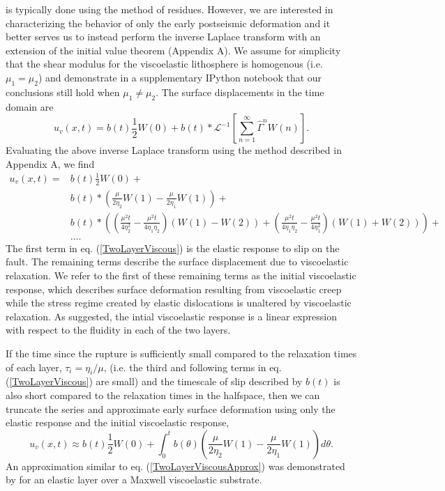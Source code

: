 \documentclass[extra]{gji}
\begin{document}
is typically done using the method of residues. However, we are interested in characterizing
the behavior of only the early postseismic deformation and it better serves us
to instead perform the inverse Laplace transform with an extension of
the initial value theorem (Appendix A). We assume for simplicity that
the shear modulus for the viscoelastic lithosphere is homogenous
(i.e. $\mu_1 = \mu_2$) and demonstrate in a supplementary IPython
notebook that our conclusions still hold when $\mu_1 \neq \mu_2$.  The
surface displacements in the time domain are
\begin{equation}
 u_v(x,t) = b(t)\frac{1}{2}W(0) + 
            b(t)\ast\mathcal{L}^{-1}\left[\sum_{n=1}^\infty\hat{\Gamma}^{n}W(n)\right].
\end{equation}
Evaluating the above inverse Laplace transform using the method
described in Appendix A, we find 
\begin{align}\label{TwoLayerViscous}
  u_v(x,t) = &b(t)\frac{1}{2}W(0) +\nonumber\\
             &b(t)\ast\left(\frac{\mu}{2\eta_2}W(1) - \frac{\mu}{2\eta_1}W(1)\right) +\nonumber\\
             &b(t)\ast\left(\left(\frac{\mu^2t}{4\eta_2^2} -
                  \frac{\mu^2t}{4\eta_1\eta_2}\right) \left(W(1) - W(2)\right) +
                  \left(\frac{\mu^2t}{4\eta_1\eta_2} - \frac{\mu^2t}{4\eta_1^2}\right)
                  \left(W(1) + W(2)\right)\right) + \nonumber\\ 
             &\dots.
\end{align}
The first term in eq. (\ref{TwoLayerViscous}) is the elastic response
to slip on the fault.  The remaining terms describe the surface
displacement due to viscoelastic relaxation.  We refer to the first of
these remaining terms as the initial viscoelastic response, which
describes surface deformation resulting from viscoelastic creep while
the stress regime created by elastic dislocations is unaltered by
viscoelastic relaxation. As suggested, the intial viscoelastic
response is a linear expression with respect to the fluidity in each
of the two layers.

If the time since the rupture is sufficiently small compared to the
relaxation times of each layer, $\tau_i=\eta_i/\mu$, (i.e. the third
and following terms in eq. (\ref{TwoLayerViscous}) are small) and the
timescale of slip described by $b(t)$ is also short compared to the
relaxation times in the halfspace, then we can truncate the series and
approximate early surface deformation using only the elastic response
and the initial viscoelastic response,
\begin{equation}\label{TwoLayerViscousApprox}
 u_v(x,t) \approx b(t)\frac{1}{2}W(0) + 
          \int_0^t b(\theta)\left(\frac{\mu}{2\eta_2}W(1) - 
                  \frac{\mu}{2\eta_1}W(1)\right)d\theta.
\end{equation} 
An approximation similar to eq. (\ref{TwoLayerViscousApprox}) was
demonstrated by \citet{S2010} for an elastic layer over a Maxwell
viscoelastic substrate. 
\end{document}
